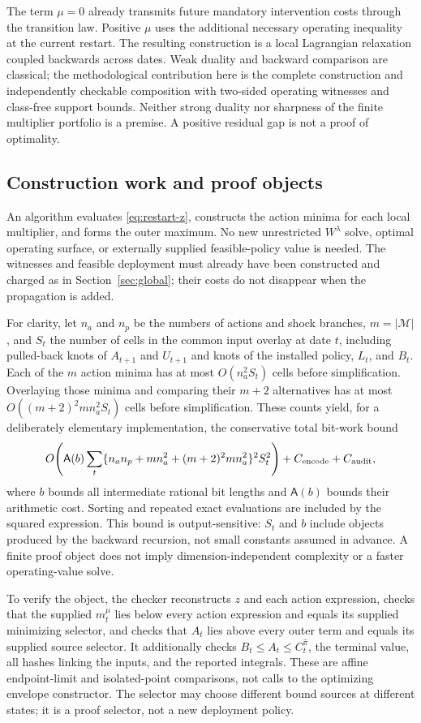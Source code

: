 The term $\mu=0$ already transmits future mandatory intervention costs through the transition law. Positive $\mu$ uses the additional necessary operating inequality at the current restart. The resulting construction is a local Lagrangian relaxation coupled backwards across dates. Weak duality and backward comparison are classical; the methodological contribution here is the complete construction and independently checkable composition with two-sided operating witnesses and class-free support bounds. Neither strong duality nor sharpness of the finite multiplier portfolio is a premise. A positive residual gap is not a proof of optimality.

\subsection{Construction work and proof objects}\label{sec:restart-work}
An algorithm evaluates \eqref{eq:restart-z}, constructs the action minima for each local multiplier, and forms the outer maximum. No new unrestricted $W^\lambda$ solve, optimal operating surface, or externally supplied feasible-policy value is needed. The witnesses and feasible deployment must already have been constructed and charged as in Section~\ref{sec:global}; their costs do not disappear when the propagation is added.

For clarity, let $n_a$ and $n_p$ be the numbers of actions and shock branches, $m=|\mathcal M|$, and $S_t$ the number of cells in the common input overlay at date $t$, including pulled-back knots of $A_{t+1}$ and $U_{t+1}$ and knots of the installed policy, $L_t$, and $B_t$. Each of the $m$ action minima has at most $O(n_a^2S_t)$ cells before simplification. Overlaying those minima and comparing their $m+2$ alternatives has at most $O((m+2)^2m n_a^2S_t)$ cells before simplification. These counts yield, for a deliberately elementary implementation, the conservative total bit-work bound
\begin{equation}\label{eq:restart-work}
 O\!\left(\mathsf A(b)\sum_t
     \{n_an_p+m n_a^2+(m+2)^2m n_a^2\}^2 S_t^2\right)
       +C_{\rm encode}+C_{\rm audit},
\end{equation}
where $b$ bounds all intermediate rational bit lengths and $\mathsf A(b)$ bounds their arithmetic cost. Sorting and repeated exact evaluations are included by the squared expression. This bound is output-sensitive: $S_t$ and $b$ include objects produced by the backward recursion, not small constants assumed in advance. A finite proof object does not imply dimension-independent complexity or a faster operating-value solve.

To verify the object, the checker reconstructs $z$ and each action expression, checks that the supplied $m_t^\mu$ lies below every action expression and equals its supplied minimizing selector, and checks that $A_t$ lies above every outer term and equals its supplied source selector. It additionally checks $B_t\le A_t\le C_t^{\widehat\pi}$, the terminal value, all hashes linking the inputs, and the reported integrals. These are affine endpoint-limit and isolated-point comparisons, not calls to the optimizing envelope constructor. The selector may choose different bound sources at different states; it is a proof selector, not a new deployment policy.
